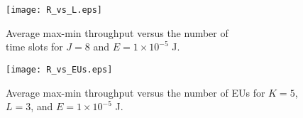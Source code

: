 \documentclass[12pt,draftclsnofoot, onecolumn]{IEEEtran}
\theoremstyle{plain}
\begin{document}
\begin{sloppypar}


\begin{figure}[!t]
	\begin{minipage}[t]{0.5\linewidth}
		\hspace{-3mm}
		\texttt{[image: R\_vs\_L.eps]}\vspace{-1.5mm}
		\caption{Average max-min throughput versus the number of\\ time slots for $J = 8$ and $E = 1\times10^{-5}$ J.}
		\label{fig:R_vs_L}
	\end{minipage}%
	\begin{minipage}[t]{0.5\linewidth}
		\centering
		\texttt{[image: R\_vs\_EUs.eps]}\vspace{-1.5mm}
		\caption{Average max-min throughput versus the number of EUs for $K = 5$, $L = 3$, and $E = 1\times10^{-5}$ J.}
		\label{fig:R_vs_EUs}
	\end{minipage}
	\vspace{-3mm}
\end{figure}


\end{sloppypar}
\end{document}
